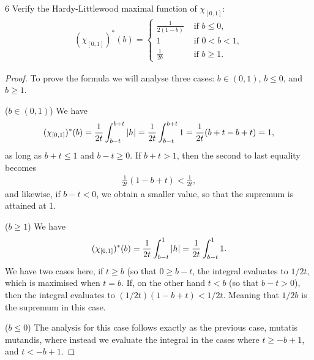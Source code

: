 \begin{exercise}{6}
Verify the Hardy-Littlewood maximal function of $\chi_{[0,1]}$:
\begin{align*}
    (\chi_{[0,1]})^\ast(b) =
    \begin{cases}
        \frac{1}{2(1-b)} &\text{ if } b \leq 0,\\
        1 &\text{ if } 0 < b < 1,\\
        \frac{1}{2b} &\text{ if } b\geq 1.
    \end{cases}
\end{align*}
\end{exercise}
\begin{proof}
To prove the formula we will analyse three cases: 
$b \in (0,1)$, $b \leq 0$, and $b \geq 1$.

($b \in (0,1)$)
We have
\begin{align*}
    (\chi_{[0,1]})^\ast(b)
    = \frac{1}{2t} \int_{b-t}^{b+t} \left\lvert h\right\rvert
    = \frac{1}{2t} \int_{b-t}^{b+t} 1
    = \frac{1}{2t} (b + t - b + t)
    = 1,
\end{align*}
as long as $b + t \leq 1$ and $b - t \geq 0$.
If $b + t > 1$, then the second to last equality becomes
\begin{align*}
    \frac{1}{2t}(1 - b + t) < \frac{1}{2t},
\end{align*}
and likewise, if $b - t < 0$, we obtain a smaller value, so that the supremum is attained at 1.

($b \geq 1$)
We have
\begin{align*}
    (\chi_{[0,1]})^\ast(b)
    = \frac{1}{2t} \int_{b-t}^{1} \left\lvert h\right\rvert
    = \frac{1}{2t} \int_{b-t}^{1} 1.
\end{align*}
We have two cases here, if $t \geq b$ (so that $0 \geq b - t$, the integral evaluates to $1/2t$, which is maximised when $t = b$.
If, on the other hand $t < b$ (so that $b - t > 0$), then the integral evaluates to $(1/2t)(1 - b + t) < 1/2t$.
Meaning that $1/2b$ is the supremum in this case.

($b \leq 0$)
The analysis for this case follows exactly as the previous case, mutatis mutandis, where instead we evaluate the integral in the cases where $t \geq -b + 1$, and $t < -b + 1$.
\end{proof} 

